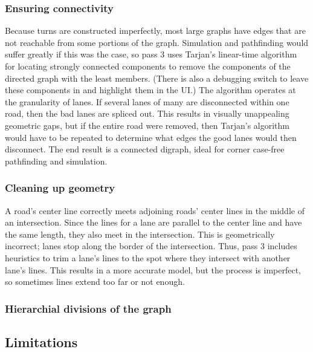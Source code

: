 \documentclass[letterpaper, 10 pt, conference]{ieeeconf}  %
\begin{document}
\subsubsection{Ensuring connectivity}

Because turns are constructed imperfectly, most large graphs have edges that are
not reachable from some portions of the graph. Simulation and pathfinding would
suffer greatly if this was the case, so pass 3 uses Tarjan's linear-time
algorithm for locating strongly connected components to remove the components of
the directed graph with the least members. (There is also a debugging switch to
leave these components in and highlight them in the UI.) The algorithm operates
at the granularity of lanes. If several lanes of many are disconnected within
one road, then the bad lanes are spliced out. This results in visually
unappealing geometric gaps, but if the entire road were removed, then Tarjan's
algorithm would have to be repeated to determine what edges the good lanes would
then disconnect. The end result is a connected digraph, ideal for corner
case-free pathfinding and simulation.

\subsubsection{Cleaning up geometry}

A road's center line correctly meets adjoining roads' center lines in the middle
of an intersection. Since the lines for a lane are parallel to the center line
and have the same length, they also meet in the intersection. This is
geometrically incorrect; lanes stop along the border of the intersection. Thus,
pass 3 includes heuristics to trim a lane's lines to the spot where they
intersect with another lane's lines. This results in a more accurate model, but
the process is imperfect, so sometimes lines extend too far or not enough.

\subsubsection{Hierarchial divisions of the graph}


\subsection{Limitations}
\end{document}
